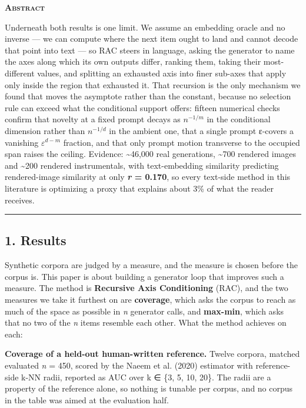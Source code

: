 \documentclass[
  10pt,
]{article}
\theoremstyle{plain}
\theoremstyle{definition}
\newenvironment{iclrabstract}
  {\vspace{0.4em}\begin{center}{\bfseries\scshape Abstract}\end{center}
   \begin{list}{}{\setlength{\leftmargin}{0.45in}\setlength{\rightmargin}{0.45in}}\item[]\relax}
  {\end{list}\vspace{0.6em}}
\begin{document}
\begin{iclrabstract}
Underneath both results is one limit. We assume an embedding oracle and
no inverse --- we can compute where the next item ought to land and
cannot decode that point into text --- so RAC steers in language, asking
the generator to name the axes along which its own outputs differ,
ranking them, taking their most-different values, and splitting an
exhausted axis into finer sub-axes that apply only inside the region
that exhausted it. That recursion is the only mechanism we found that
moves the asymptote rather than the constant, because no selection rule
can exceed what the conditional support offers: fifteen numerical checks
confirm that novelty at a fixed prompt decays as \(n^{-1/m}\) in the
conditional dimension rather than \(n^{-1/d}\) in the ambient one, that
a single prompt ε-covers a vanishing \(ε^{d-m}\) fraction, and that only
prompt motion transverse to the occupied span raises the ceiling.
Evidence: \textasciitilde46,000 real generations, \textasciitilde700
rendered images and \textasciitilde200 rendered instrumentals, with
text-embedding similarity predicting rendered-image similarity at only
\textbf{\emph{r} = 0.170}, so every text-side method in this literature
is optimizing a proxy that explains about 3\% of what the reader
receives.

\begin{center}\rule{0.5\linewidth}{0.5pt}\end{center}

\end{iclrabstract}

\subsection{1. Results}\label{1-results}

Synthetic corpora are judged by a measure, and the measure is chosen
before the corpus is. This paper is about building a generator loop that
improves such a measure. The method is \textbf{Recursive Axis
Conditioning} (RAC), and the two measures we take it furthest on are
\textbf{coverage}, which asks the corpus to reach as much of the space
as possible in \emph{n} generator calls, and \textbf{max-min}, which
asks that no two of the \emph{n} items resemble each other. What the
method achieves on each:

\textbf{Coverage of a held-out human-written reference.} Twelve corpora,
matched evaluated \emph{n} = 450, scored by the Naeem et al. (2020)
estimator with reference-side k-NN radii, reported as AUC over k ∈ \{3,
5, 10, 20\}. The radii are a property of the reference alone, so nothing
is tunable per corpus, and no corpus in the table was aimed at the
evaluation half.
\end{document}
